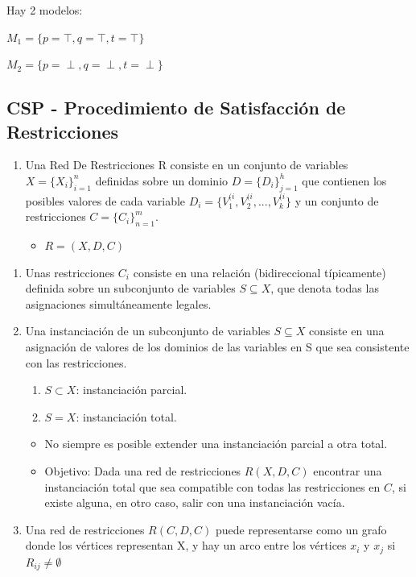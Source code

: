 \documentclass[12pt, twoside, openright]{report} %
\begin{document}
Hay 2 modelos:

$M_1= \{ p= \top, q=\top, t=\top \}$

$M_2= \{ p= \perp, q=\perp, t=\perp \}$

\subsection{CSP - Procedimiento de Satisfacción de Restricciones}

\begin{enumerate}
	\def\labelenumi{\arabic{enumi}.}
	\item Una Red De Restricciones R consiste en un conjunto de variables
	      \(X=\{ X_i \}^n_{i=1}\) definidas sobre un dominio
	      \(D=\{ D_i \}^h_{j=1}\) que contienen los posibles valores de cada
	      variable \(D_i=\{ V_1^{(i}, V_2^{(i}, ..., V_k^{(i} \}\) y un
	      conjunto de restricciones \(C=\{ C_i \}^m_{n=1}\).

	      \begin{itemize}
		      \item \(R = (X, D, C)\)
	      \end{itemize}
\end{enumerate}


\begin{enumerate}
	\def\labelenumi{\arabic{enumi}.}
	\setcounter{enumi}{1}
	\item Unas restricciones \(C_i\) consiste en una relación (bidireccional
	      típicamente) definida sobre un subconjunto de variables
	      \(S \subseteq X\), que denota todas las asignaciones simultáneamente
	      legales.
	\item Una instanciación de un subconjunto de variables \(S \subseteq X\)
	      consiste en una asignación de valores de los dominios de las
	      variables en S que sea consistente con las restricciones.

	      \begin{enumerate}
		      \item \(S \subset X\): instanciación parcial.
		      \item \(S = X\): instanciación total.
	      \end{enumerate}


	      \begin{itemize}
		      \item No siempre es posible extender una instanciación parcial a otra
		            total.
		      \item Objetivo: Dada una red de restricciones \(R(X, D, C)\) encontrar una
		            instanciación total que sea compatible con todas las restricciones en
		            \(C\), si existe alguna, en otro caso, salir con una instanciación
		            vacía.
	      \end{itemize}
	\item Una red de restricciones \(R(C, D, C)\) puede representarse como un
	      grafo donde los vértices representan X, y hay un arco entre los
	      vértices \(x_i\) y \(x_j\) si \(R_{ij} \neq \emptyset\)

\end{enumerate}
\end{document}
